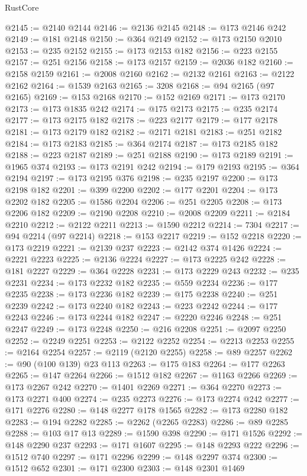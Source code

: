 \begin{lexlean}{RustCore}
\begin{coremodule}
@2145 := @2140 @2144
@2146 := @2136 @2145
@2148 := @173 @2146 @242
@2149 := @181 @2148
@2150 := @364 @2149
@2152 := @173 @2150 @2010
@2153 := @235 @2152
@2155 := @173 @2153 @182
@2156 := @223 @2155
@2157 := @251 @2156
@2158 := @173 @2157
@2159 := @2036 @182
@2160 := @2158 @2159
@2161 := @2008 @2160
@2162 := @2132 @2161
@2163 := @2122 @2162
@2164 := @1539 @2163
@2165 := 3208
@2168 := @94 @2165 (@97 @2165)
@2169 := @153 @2168
@2170 := @152 @2169
@2171 := @173 @2170
@2173 := @173 @1835 @242
@2174 := @175 @2173
@2175 := @235 @2174
@2177 := @173 @2175 @182
@2178 := @223 @2177
@2179 := @177 @2178
@2181 := @173 @2179 @182
@2182 := @2171 @2181
@2183 := @251 @2182
@2184 := @173 @2183
@2185 := @364 @2174
@2187 := @173 @2185 @182
@2188 := @223 @2187
@2189 := @251 @2188
@2190 := @173 @2189
@2191 := @1965 @374
@2193 := @173 @2191 @242
@2194 := @179 @2193
@2195 := @364 @2194
@2197 := @173 @2195 @376
@2198 := @235 @2197
@2200 := @173 @2198 @182
@2201 := @399 @2200
@2202 := @177 @2201
@2204 := @173 @2202 @182
@2205 := @1586 @2204
@2206 := @251 @2205
@2208 := @173 @2206 @182
@2209 := @2190 @2208
@2210 := @2008 @2209
@2211 := @2184 @2210
@2212 := @2122 @2211
@2213 := @1590 @2212
@2214 := 7304
@2217 := @94 @2214 (@97 @2214)
@2218 := @153 @2217
@2219 := @152 @2218
@2220 := @173 @2219
@2221 := @2139 @237
@2223 := @2142 @374 @1426
@2224 := @2221 @2223
@2225 := @2136 @2224
@2227 := @173 @2225 @242
@2228 := @181 @2227
@2229 := @364 @2228
@2231 := @173 @2229 @243
@2232 := @235 @2231
@2234 := @173 @2232 @182
@2235 := @559 @2234
@2236 := @177 @2235
@2238 := @173 @2236 @182
@2239 := @175 @2238
@2240 := @251 @2239
@2242 := @173 @2240 @182
@2243 := @223 @2242
@2244 := @177 @2243
@2246 := @173 @2244 @182
@2247 := @2220 @2246
@2248 := @251 @2247
@2249 := @173 @2248
@2250 := @216 @2208
@2251 := @2097 @2250
@2252 := @2249 @2251
@2253 := @2122 @2252
@2254 := @2213 @2253
@2255 := @2164 @2254
@2257 := @2119 (@2120 @2255)
@2258 := @89 @2257
@2262 := @90 (@100 @139) @23 @113
@2263 := @175 @183
@2264 := @177 @2263
@2265 := @147 @2264
@2266 := @1512 @182
@2267 := @1163 @2266
@2269 := @173 @2267 @242
@2270 := @1401 @2269
@2271 := @364 @2270
@2273 := @173 @2271 @400
@2274 := @235 @2273
@2276 := @173 @2274 @242
@2277 := @171 @2276
@2280 := @148 @2277 @178 @1565
@2282 := @173 @2280 @182
@2283 := @194 @2282
@2285 := @2262 (@2265 @2283)
@2286 := @89 @2285
@2288 := @103 @17 @13
@2289 := @1590 @398
@2290 := @171 @1526
@2292 := @148 @2290 @237
@2293 := @171 @1607
@2295 := @148 @2293 @222
@2296 := @1512 @740
@2297 := @171 @2296
@2299 := @148 @2297 @374
@2300 := @1512 @652
@2301 := @171 @2300
@2303 := @148 @2301 @1469

\end{coremodule}
\end{lexlean}
